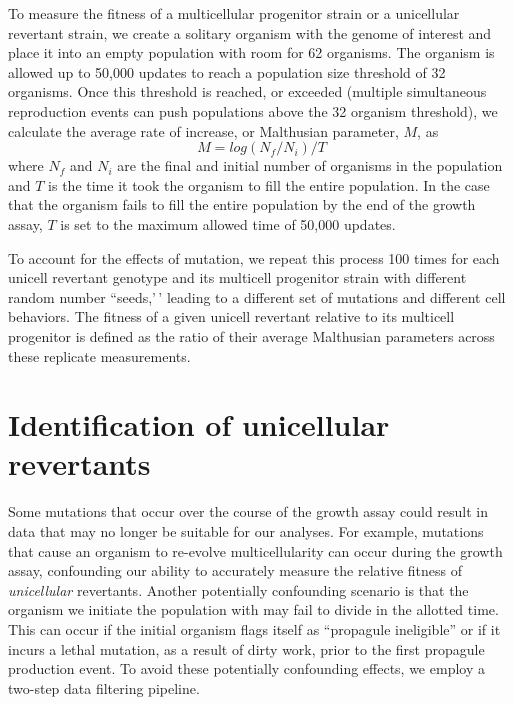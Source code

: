 \documentclass[
]{book}
\begin{document}
To measure the fitness of a multicellular progenitor strain or a unicellular revertant strain, we create a solitary organism with the genome of interest and place it into an empty population with room for 62 organisms. The organism is allowed up to 50,000 updates to reach a population size threshold of 32 organisms. Once this threshold is reached, or exceeded (multiple simultaneous reproduction events can push populations above the 32 organism threshold), we calculate the average rate of increase, or Malthusian parameter, \(M\), as
\begin{equation}
\ M = log(N_f / N_i )/T
\end{equation}
where \(N_f\) and \(N_i\) are the final and initial number of organisms in the population and \(T\) is the time it took the organism to fill the entire population. In the case that the organism fails to fill the entire population by the end of the growth assay, \(T\) is set to the maximum allowed time of 50,000 updates.

To account for the effects of mutation, we repeat this process 100 times for each unicell revertant genotype and its multicell progenitor strain with different random number ``seeds,'\,' leading to a different set of mutations and different cell behaviors. The fitness of a given unicell revertant relative to its multicell progenitor is defined as the ratio of their average Malthusian parameters across these replicate measurements.

\hypertarget{identification-of-unicellular-revertants}{%
\section{Identification of unicellular revertants}\label{identification-of-unicellular-revertants}}

Some mutations that occur over the course of the growth assay could result in data that may no longer be suitable for our analyses. For example, mutations that cause an organism to re-evolve multicellularity can occur during the growth assay, confounding our ability to accurately measure the relative fitness of \textit{unicellular} revertants. Another potentially confounding scenario is that the organism we initiate the population with may fail to divide in the allotted time. This can occur if the initial organism flags itself as ``propagule ineligible'' or if it incurs a lethal mutation, as a result of dirty work, prior to the first propagule production event. To avoid these potentially confounding effects, we employ a two-step data filtering pipeline.
\end{document}
